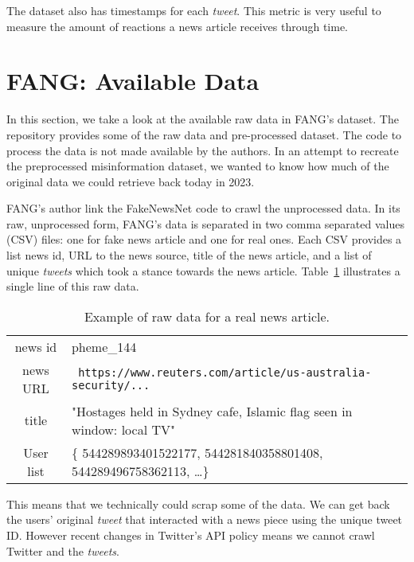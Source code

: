 The dataset also has timestamps for each \textit{tweet}.
This metric is very useful to measure the amount of reactions a news article receives through time.

\section{FANG: Available Data}

In this section, we take a look at the available raw data in FANG's dataset.
The repository provides some of the raw data and pre-processed dataset. 
The code to process the data is not made available by the authors.
In an attempt to recreate the preprocessed misinformation dataset, we wanted to know how much of the original data we could retrieve back today in 2023.

FANG's author link the FakeNewsNet code to crawl the unprocessed data.
In its raw, unprocessed form, FANG's data is separated in two comma separated values (CSV) files: one for fake news article and one for real ones.
Each CSV provides a list news id, URL to the news source, title of the news article, and a list of unique \textit{tweets} which took a stance towards the news article.
Table~\ref{tab:fang_raw_data} illustrates a single line of this raw data.

\begin{table}[h]
    \caption{Example of raw data for a real news article.}
    \label{tab:fang_raw_data}
    \begin{tabular}{cl}
        \toprule
        news id & pheme\_144\\
        news URL & \verb| https://www.reuters.com/article/us-australia-security/...|\\
        title & "Hostages held in Sydney cafe, Islamic flag seen in window: local TV"\\
        User list & \{ 544289893401522177, 544281840358801408, 544289496758362113, \dots \} \\
        \bottomrule
    \end{tabular}
\end{table}

This means that we technically could scrap some of the data.
We can get back the users' original \textit{tweet} that interacted with a news piece using the unique tweet ID.
However recent changes in Twitter's API policy means we cannot crawl Twitter and the \textit{tweets}.

